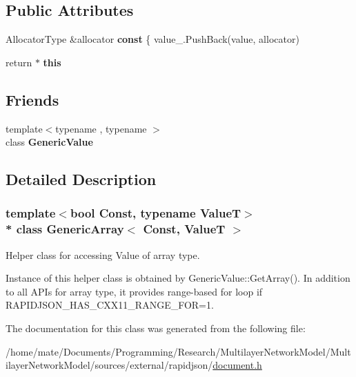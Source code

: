 \subsection*{Public Attributes}
\begin{DoxyCompactItemize}
\item 
Allocator\+Type \&allocator {\bfseries const} \{ value\+\_\+.\+Push\+Back(value, allocator)\hypertarget{classGenericArray_a25d2ed55daa117c41db6a5b3f87e9ddc}{}\label{classGenericArray_a25d2ed55daa117c41db6a5b3f87e9ddc}

\item 
return $\ast$ {\bfseries this}\hypertarget{classGenericArray_aef8b7baa9ec5cd68d8951fa8bad85217}{}\label{classGenericArray_aef8b7baa9ec5cd68d8951fa8bad85217}

\end{DoxyCompactItemize}
\subsection*{Friends}
\begin{DoxyCompactItemize}
\item 
{\footnotesize template$<$typename , typename $>$ }\\class {\bfseries Generic\+Value}\hypertarget{classGenericArray_a899449e1a645b5e377af059fb61113d8}{}\label{classGenericArray_a899449e1a645b5e377af059fb61113d8}

\end{DoxyCompactItemize}


\subsection{Detailed Description}
\subsubsection*{template$<$bool Const, typename ValueT$>$\\*
class Generic\+Array$<$ Const, Value\+T $>$}

Helper class for accessing Value of array type. 

Instance of this helper class is obtained by {\ttfamily Generic\+Value\+::\+Get\+Array()}. In addition to all A\+P\+Is for array type, it provides range-\/based for loop if {\ttfamily R\+A\+P\+I\+D\+J\+S\+O\+N\+\_\+\+H\+A\+S\+\_\+\+C\+X\+X11\+\_\+\+R\+A\+N\+G\+E\+\_\+\+F\+OR=1}. 

The documentation for this class was generated from the following file\+:\begin{DoxyCompactItemize}
\item 
/home/mate/\+Documents/\+Programming/\+Research/\+Multilayer\+Network\+Model/\+Multilayer\+Network\+Model/sources/external/rapidjson/\hyperlink{document_8h}{document.\+h}\end{DoxyCompactItemize}
